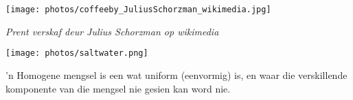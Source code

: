 
\begin{minipage}{.5\textwidth}
\begin{center}
 \texttt{[image: photos/coffeeby\_JuliusSchorzman\_wikimedia.jpg]}\par
\textit{Prent verskaf deur Julius Schorzman op wikimedia}
\end{center}
\end{minipage}
\begin{minipage}{.5\textwidth}
\begin{center}
 \texttt{[image: photos/saltwater.png]}\par
\end{center}
\end{minipage}
\label{m38708*fhsst!!!underscore!!!id96} { \label{m38708*meaningfhsst!!!underscore!!!id96}
        'n Homogene mengsel is een wat uniform (eenvormig) is, en waar die verskillende komponente van die mengsel nie gesien kan word nie.
         } 

